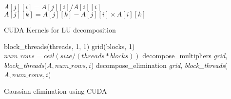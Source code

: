 \begin{algorithm}[H]
\begin{algorithmic}
		\State $A[j][i] = A[j][i] / A[i][i]$ 
	\EndFor
\EndProcedure
\\
			\State $A[j][k] = A[j][k] - A[j][i] \times A[i][k]$ 
		\EndFor
	\EndFor
\EndProcedure

\end{algorithmic}
\caption{CUDA Kernels for LU decomposition}
\label{alg:cuda_kernels}
\end{algorithm}


\begin{algorithm}[H]
\begin{algorithmic}
	\State block\_threads(threads, 1, 1)
	\State grid(blocks, 1)
	\State $num\_rows = ceil(size / (threads * blocks))$ 
	\State decompose\_multipliers  \guilsinglleft \guilsinglleft \guilsinglleft \textit{grid}, \textit{block\_threads}\guilsinglright \guilsinglright \guilsinglright ($A, num\_rows, i$)
		\State decompose\_elimination  \guilsinglleft \guilsinglleft \guilsinglleft \textit{grid}, \textit{block\_threads}\guilsinglright \guilsinglright \guilsinglright ($A, num\_rows, i$)
\EndFor
\end{algorithmic}
\caption{Gaussian elimination using CUDA}
\label{alg:cuda_code}
\end{algorithm}


